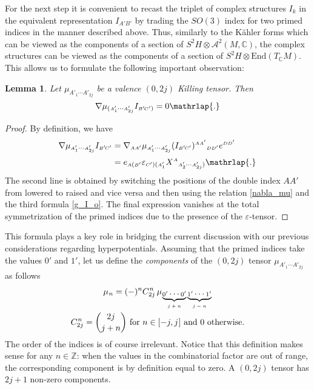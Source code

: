 \documentclass[11pt]{amsart}
\newtheorem{lemma}[theorem]{Lemma}
\theoremstyle{remark}
\theoremstyle{remark}
\theoremstyle{definition}
\theoremstyle{definition}
\theoremstyle{definition}
\newcommand{\0}{{\scriptstyle 0'}} %
\newcommand{\1}{{\scriptstyle 1'}}
\newcommand{\A}{{\scriptscriptstyle A}} %
\newcommand{\B}{{\scriptscriptstyle B}}
\newcommand{\C}{{\scriptscriptstyle C}}
\newcommand{\D}{{\scriptscriptstyle D}}
\newcommand{\hp}{\hspace{0.5pt}} %
\newcommand{\npt}{\hspace{-1pt}} %
\begin{document}
For the next step it is convenient to recast the triplet of complex structures $I_k$ in the equivalent representation $I_{\A'\B'}$ by trading the $SO(3)$ index for two primed indices in the manner described above. Thus, similarly to the K\"ahler forms which can be viewed as the components of a section of $S^2H \otimes \mathscr{A}^2(M,\mathbb{C})$, the complex structures can be viewed as the components of a section of $S^2H \otimes \text{End}(T_{\mathbb{C}}M)$. This allows us to formulate the following important observation: 

\begin{lemma} \label{pic}
Let $\mu_{\A'_1\cdots\A'_{2j}}$ be a valence $(0,2j)$ Killing tensor. Then
\begin{equation} \label{nabla_mu_I}
\nabla \mu_{(\A'_1 \cdots \A'_{2j}} I_{\B'\npt\C')} = 0 \mathrlap{.}
\end{equation}
\end{lemma}

\begin{proof}
By definition, we have
{\allowdisplaybreaks
\begin{equation}
\begin{aligned}
\nabla \mu_{\A'_1 \cdots \A'_{2j}} I_{\B'\npt\C'} & = \nabla_{\A\A'} \mu_{\A'_1 \cdots \A'_{2j}} (I_{\B'\npt\C'})^{\A\A'}{}_{\D\D'} e^{\D\D'} \\[2pt]
& = e_{\A(\B'} \varepsilon_{\C')(\A'_1} X^{\A}{}_{\A'_2 \cdots \A'_{2j})} \mathrlap{.}
\end{aligned}
\end{equation}
}The second line is obtained by switching the positions of the double index $AA'$ from lowered to raised and vice versa and then using the relation \eqref{nabla_mu} and the third formula \eqref{g_I_o}. The final expression vanishes at the total symmetrization of the primed indices due to the presence of the $\varepsilon$-tensor.
\end{proof}

This formula plays a key role in bridging the current discussion with our previous considerations regarding hyperpotentials. Assuming that the primed indices take the values $0'$ and $1'$, let us define the \textit{components} of the $(0,2j)$ tensor $\mu_{\A'_1 \cdots \A'_{2j}}$ as follows
{\allowdisplaybreaks
\begin{gather}
\mu_{\hp n} = (-)^n C^{\hp n}_{2j} \, \mu_{\hp\underbrace{\0 \cdots \0}_\text{$j+n$}\underbrace{\1 \cdots \1}_\text{$j-n$}} \\
C^{\hp n}_{2j} = \dbinom{2j}{j+n} \text{ for $n \in [-j,j\hp ]$ and $0$ otherwise.} \nonumber
\end{gather}
}%
The order of the indices is of course irrelevant. Notice that this definition makes sense for any $n \in \mathbb{Z}$: when the values in the combinatorial factor are out of range, the corresponding component is by definition equal to zero. A $(0,2j)$ tensor has $2j+1$ non-zero components. 
\end{document}
